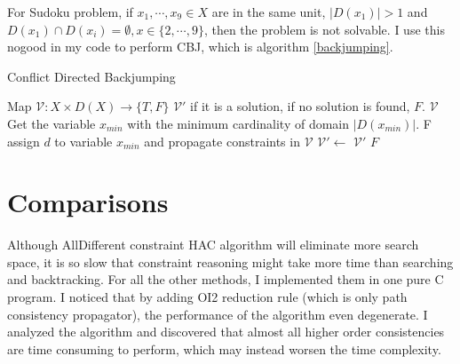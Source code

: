 \documentclass[a4paper, 12pt]{report}
\begin{document}
            For Sudoku problem, if $x_1,\cdots, x_9\in X$ are in the same unit, $|D(x_1)|>1$ and $D(x_1)\cap D(x_i)=\emptyset, x\in\{2,\cdots,9\}$, then the problem is not solvable. I use this nogood in my code to perform CBJ, which is algorithm \ref{backjumping}.

             \begin{algorithm}
                \caption{Conflict Directed Backjumping}
                \label{backjumping}
                \begin{algorithmic}[1]
                    \Require Map $\mathcal V:X\times D(X) \to \{T,F\}$
                    \Ensure $\mathcal V'$ if it is a solution, if no solution is found, $F$.
                            \State \Return $\mathcal V$
                        \EndIf
                        \State Get the variable $x_{min}$ with the minimum cardinality of domain $|D(x_{min})|$.
                                    \State \Return F  
                                \EndIf
                            \EndFor
                            \State assign $d$ to variable $x_{min}$ and propagate constraints in $\mathcal V$
                                \State $\mathcal V'\leftarrow$ 
                                    \State \Return $\mathcal V'$
                                \EndIf
                            \EndIf
                        \EndFor
                        \State \Return $F$
                    \EndFunction
                \end{algorithmic}
            \end{algorithm}
    \section {Comparisons}
        Although AllDifferent constraint HAC algorithm will eliminate more search space, it is so slow that constraint reasoning might take more time than searching and backtracking. For all the other methods, I implemented them in one pure C program. I noticed that by adding OI2 reduction rule (which is only path consistency propagator), the performance of the algorithm even degenerate. I analyzed the algorithm and discovered that almost all higher order consistencies are
        time consuming to perform, which may instead worsen the time complexity.

{}

\end{document}
